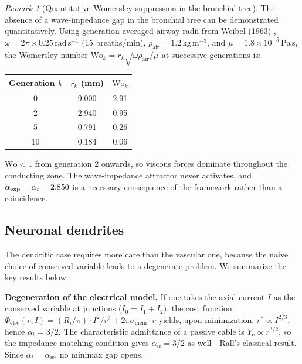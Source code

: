 \documentclass[11pt,a4paper]{article}
\theoremstyle{remark}
\newtheorem{remark}{Remark}
\begin{document}
\begin{remark}[Quantitative Womersley suppression in the bronchial tree]
The absence of a wave-impedance gap in the bronchial tree can be demonstrated
quantitatively. Using generation-averaged airway radii from Weibel (1963)
\cite{weibel1963}, $\omega = 2\pi \times 0.25\,\mathrm{rad\,s^{-1}}$ (15 breaths/min),
$\rho_{\mathrm{air}} = 1.2\,\mathrm{kg\,m^{-3}}$, and
$\mu = 1.8 \times 10^{-5}\,\mathrm{Pa\,s}$, the Womersley number
$\mathrm{Wo}_k = r_k \sqrt{\omega\rho_{\mathrm{air}}/\mu}$ at successive generations is:

\begin{center}
\begin{tabular}{ccc}
\hline
Generation $k$ & $r_k$ (mm) & $\mathrm{Wo}_k$ \\
\hline
0  & 9.000 & 2.91 \\
2  & 2.940 & 0.95 \\
5  & 0.791 & 0.26 \\
10 & 0.184 & 0.06 \\
\hline
\end{tabular}
\end{center}

$\mathrm{Wo} < 1$ from generation 2 onwards, so viscous forces dominate
throughout the conducting zone. The wave-impedance attractor never activates,
and $\alpha_{\exp} = \alpha_t = 2.850{}$ is a necessary consequence of
the framework rather than a coincidence.
\end{remark}

\subsection{Neuronal dendrites}
The dendritic case requires more care than the vascular one, because the naive
choice of conserved variable leads to a degenerate problem. We summarize the key
results below.

\noindent\textbf{Degeneration of the electrical model.} If one takes the axial current $I$ as the conserved variable at junctions ($I_0 = I_1 + I_2$), the cost function $\Phi_{\text{elec}}(r, I) = (R_i/\pi) \cdot I^2/r^2 + 2\pi\sigma_{\text{mem}} \cdot r$ yields, upon minimization, $r^* \propto I^{2/3}$, hence $\alpha_t = 3/2$. The characteristic admittance of a passive cable is $Y_c \propto r^{3/2}$, so the impedance-matching condition gives $\alpha_w = 3/2$ as well---Rall's classical result. Since $\alpha_t = \alpha_w$, no minimax gap opens.
\end{document}
